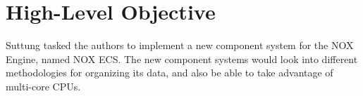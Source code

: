 \section{High-Level Objective}
Suttung tasked the authors to implement a new component system for the NOX Engine, named NOX ECS.
The new component systems would look into different methodologies for organizing its data, and also
be able to take advantage of multi-core CPUs.
